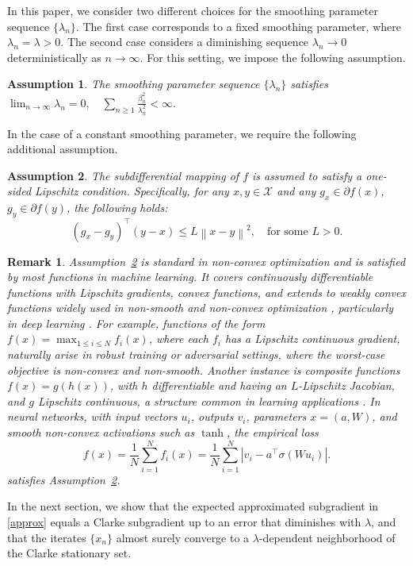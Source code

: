 \documentclass[9pt,journal,twoside,web]{ieeecolor}
\newtheorem{remark}{Remark}
\newtheorem{assumption}{Assumption}
\newcommand{\norm}[1]{\left\lVert #1 \right\rVert}
\begin{document}
\color{black}

In this paper, we consider two different choices for the smoothing parameter sequence $\{\lambda_n\}$. The first case corresponds to a fixed smoothing parameter, where $\lambda_n = \lambda > 0.$
The second case considers a diminishing sequence $\lambda_n \to 0$ deterministically as $n \to \infty$. For this setting, we impose the following assumption.

\begin{assumption}
The smoothing parameter sequence $\{\lambda_n\}$ satisfies
$ \lim_{n\to\infty} \lambda_n = 0,
    \quad
    \sum_{n\geq 1} \frac{\beta_n^2}{\lambda_n^2} < \infty.$
\label{Assumptionregardingsmoothing}
\end{assumption}
In the case of a constant smoothing parameter, we require the following additional assumption.
\color{black}
\begin{assumption}
    The subdifferential mapping of 
$f$ is assumed to satisfy a one-sided Lipschitz condition. Specifically, for any $x,y  \in \mathcal{X}$ and any $g_x \in \partial f(x)$, $g_y \in \partial f(y)$, the following holds: 
    \begin{equation*}
        (g_x-g_y)^\top (y-x) \leq L \norm{x-y}^2, \quad \text{for some  $L > 0$.}
    \end{equation*}
    \label{monotone}
\end{assumption}

\begin{remark}
\label{assum3-4}
Assumption~\ref{monotone} is standard in non-convex optimization and is satisfied by most functions in machine learning. It covers continuously differentiable functions with Lipschitz gradients, convex functions, and extends to weakly convex functions widely used in non-smooth and non-convex optimization \cite{davis2019stochastic}, particularly in deep learning \cite{zhou2017landscape}. For example, functions of the form $f(x) = \max_{1 \leq i \leq N} f_i(x)$, where each $f_i$ has a Lipschitz continuous gradient, naturally arise in robust training or adversarial settings, where the worst-case objective is non-convex and non-smooth. Another instance is composite functions $f(x) = g(h(x))$, with $h$ differentiable and having an $L$-Lipschitz Jacobian, and $g$ Lipschitz continuous, a structure common in learning applications \cite{mai2020convergence}. In neural networks, with input vectors ${u_i}$, outputs ${v_i}$, parameters $x = (a, W)$, and smooth non-convex activations such as $\tanh$, the empirical loss
  \begin{equation*}
    f(x) = \frac{1}{N} \sum\limits_{i=1}^{N} f_i(x) = \frac{1}{N} \sum\limits_{i=1}^{N} |v_i - a^\top \sigma (W u_i)|.
\end{equation*}
satisfies Assumption~\ref{monotone}.
\end{remark}
In the next section, we show that the expected approximated subgradient in \eqref{approx} equals a Clarke subgradient up to an error that diminishes with $\lambda$, and that the iterates $\{x_n\}$ almost surely converge to a $\lambda$-dependent neighborhood of the Clarke stationary set.
\end{document}
